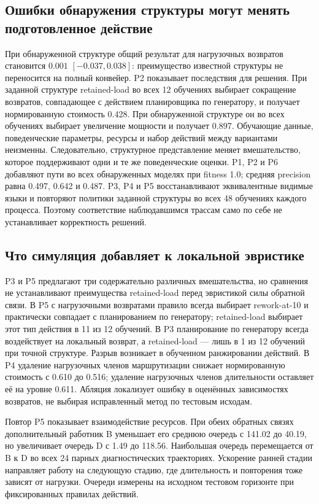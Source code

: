 \subsection{Ошибки обнаружения структуры могут менять подготовленное действие}
При обнаруженной структуре общий результат для нагрузочных возвратов становится $0.001$ $[-0.037,0.038]$: преимущество известной структуры не переносится на полный конвейер. P2 показывает последствия для решения. При заданной структуре retained-load во всех 12 обучениях выбирает сокращение возвратов, совпадающее с действием планировщика по генератору, и получает нормированную стоимость 0.428. При обнаруженной структуре он во всех обучениях выбирает увеличение мощности и получает 0.897. Обучающие данные, поведенческие параметры, ресурсы и набор действий между вариантами неизменны. Следовательно, структурное представление меняет вмешательство, которое поддерживают одни и те же поведенческие оценки. P1, P2 и P6 добавляют пути во всех обнаруженных моделях при fitness 1.0; средняя precision равна 0.497, 0.642 и 0.487. P3, P4 и P5 восстанавливают эквивалентные видимые языки и повторяют политики заданной структуры во всех 48 обучениях каждого процесса. Поэтому соответствие наблюдавшимся трассам само по себе не устанавливает корректность решений.

\subsection{Что симуляция добавляет к локальной эвристике}
P3 и P5 предлагают три содержательно различных вмешательства, но сравнения не устанавливают преимущества retained-load перед эвристикой силы обратной связи. В P5 с нагрузочными возвратами правило всегда выбирает rework-at-10 и практически совпадает с планированием по генератору; retained-load выбирает этот тип действия в 11 из 12 обучений. В P3 планирование по генератору всегда воздействует на локальный возврат, а retained-load — лишь в 1 из 12 обучений при точной структуре. Разрыв возникает в обученном ранжировании действий. В P4 удаление нагрузочных членов маршрутизации снижает нормированную стоимость с 0.610 до 0.516; удаление нагрузочных членов длительности оставляет её на уровне 0.611. Абляция локализует ошибку в оценённых зависимостях возвратов, не выбирая исправленный метод по тестовым исходам.

Повтор P5 показывает взаимодействие ресурсов. При обеих обратных связях дополнительный работник B уменьшает его среднюю очередь с 141.02 до 40.19, но увеличивает очередь D с 1.49 до 118.56. Наибольшая очередь перемещается от B к D во всех 24 парных диагностических траекториях. Ускорение ранней стадии направляет работу на следующую стадию, где длительность и повторения тоже зависят от нагрузки. Очереди измерены на исходном тестовом горизонте при фиксированных правилах действий.

